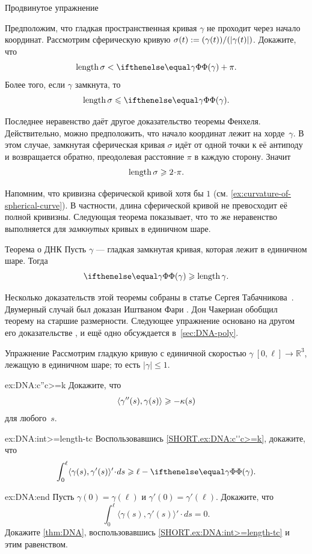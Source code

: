 \begin{thm}{Продвинутое упражнение}\label{ex:gamma/|gamma|}
{\sloppy
Предположим, что гладкая пространственная кривая $\gamma$ не проходит через начало координат.
Рассмотрим сферическую кривую $\sigma(t)\z\df\frac{\gamma(t)}{|\gamma(t)|}$.
Докажите, что
\[\length \sigma< \tc\gamma+\pi.\]
Более того, если $\gamma$ замкнута, то
\[\length \sigma\le \tc\gamma.\]

}
\end{thm}

Последнее неравенство даёт другое доказательство теоремы Фенхеля.
Действительно, можно предположить, что начало координат лежит на хорде~$\gamma$.
В этом случае, замкнутая сферическая кривая $\sigma$ идёт от одной точки к её антиподу и возвращается обратно,
преодолевая расстояние $\pi$ в каждую сторону.
Значит
\[\length\sigma\ge 2\cdot\pi.\]

Напомним, что кривизна сферической кривой хотя бы $1$
(см. \ref{ex:curvature-of-spherical-curve}).
В частности, длина сферической кривой не превосходит её полной кривизны.
Следующая теорема показывает, что то же неравенство выполняется для \textit{замкнутых} кривых в единичном шаре.

\begin{thm}{Теорема о ДНК}\label{thm:DNA}
Пусть $\gamma$ --- гладкая замкнутая кривая, которая лежит в единичном шаре.
Тогда
\[\tc\gamma\ge \length\gamma.\]

\end{thm}

Несколько доказательств этой теоремы собраны в статье Сергея Табачникова~\cite{tabachnikov}.
Двумерный случай был доказан Иштваном Фари \cite{fary1950}.
Дон Чакериан \cite{chakerian1962} обобщил теорему на старшие размерности.
Следующее упражнение основано на другом его доказательстве \cite{chakerian1964},
и ещё одно обсуждается в~\ref{sec:DNA-poly}.

\begin{thm}{Упражнение}\label{ex:DNA}
Рассмотрим гладкую кривую с единичной скоростью $\gamma\:[0,\ell]\to\mathbb{R}^3$, лежащую в единичном шаре; то есть $|\gamma|\le 1$.

\begin{subthm}{ex:DNA:c''c>=k}
Докажите, что
\[\langle\gamma''(s),\gamma(s)\rangle\geqslant-\kappa(s)\]
для любого~$s$.
\end{subthm}

\begin{subthm}{ex:DNA:int>=length-tc}
Воспользовавшись \ref{SHORT.ex:DNA:c''c>=k}, докажите, что
\[\int_0^\ell\langle\gamma(s),\gamma'(s)\rangle'\cdot ds\ge
\ell-\tc\gamma.\]

\end{subthm}

\begin{subthm}{ex:DNA:end}
Пусть $\gamma(0)=\gamma(\ell)$ и $\gamma'(0)=\gamma'(\ell)$.
Докажите, что
\[\int_0^\ell\langle\gamma(s),\gamma'(s)\rangle'\cdot ds=0.\]
Докажите \ref{thm:DNA}, воспользовавшись \ref{SHORT.ex:DNA:int>=length-tc} и этим равенством.
\end{subthm}
\end{thm}


